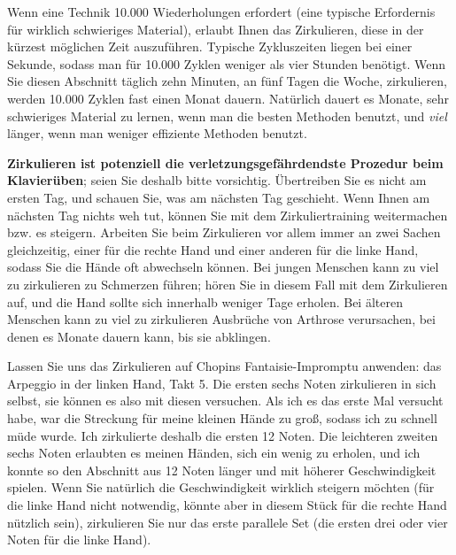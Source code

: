 Wenn eine Technik 10.000 Wiederholungen erfordert (eine typische Erfordernis für wirklich schwieriges Material), erlaubt Ihnen das Zirkulieren, diese in der kürzest möglichen Zeit auszuführen.
Typische Zykluszeiten liegen bei einer Sekunde, sodass man für 10.000 Zyklen weniger als vier Stunden benötigt.
Wenn Sie diesen Abschnitt täglich zehn Minuten, an fünf Tagen die Woche, zirkulieren, werden 10.000 Zyklen fast einen Monat dauern.
Natürlich dauert es Monate, sehr schwieriges Material zu lernen, wenn man die besten Methoden benutzt, und \textit{viel} länger, wenn man weniger effiziente Methoden benutzt.

\textbf{Zirkulieren ist potenziell die verletzungsgefährdendste Prozedur beim Klavierüben}; seien Sie deshalb bitte vorsichtig.
Übertreiben Sie es nicht am ersten Tag, und schauen Sie, was am nächsten Tag geschieht.
Wenn Ihnen am nächsten Tag nichts weh tut, können Sie mit dem Zirkuliertraining weitermachen bzw. es steigern.
Arbeiten Sie beim Zirkulieren vor allem immer an zwei Sachen gleichzeitig, einer für die rechte Hand und einer anderen für die linke Hand, sodass Sie die Hände oft abwechseln können.
Bei jungen Menschen kann zu viel zu zirkulieren zu Schmerzen führen; hören Sie in diesem Fall mit dem Zirkulieren auf, und die Hand sollte sich innerhalb weniger Tage erholen.
Bei älteren Menschen kann zu viel zu zirkulieren Ausbrüche von Arthrose verursachen, bei denen es Monate dauern kann, bis sie abklingen.
 

\label{c1iii2fi}

Lassen Sie uns das Zirkulieren auf Chopins Fantaisie-Impromptu anwenden: das Arpeggio in der linken Hand, Takt 5.
Die ersten sechs Noten zirkulieren in sich selbst, sie können es also mit diesen versuchen.
Als ich es das erste Mal versucht habe, war die Streckung für meine kleinen Hände zu groß, sodass ich zu schnell müde wurde.
Ich zirkulierte deshalb die ersten 12 Noten.
Die leichteren zweiten sechs Noten erlaubten es meinen Händen, sich ein wenig zu erholen, und ich konnte so den Abschnitt aus 12 Noten länger und mit höherer Geschwindigkeit spielen.
Wenn Sie natürlich die Geschwindigkeit wirklich steigern möchten (für die linke Hand nicht notwendig, könnte aber in diesem Stück für die rechte Hand nützlich sein), zirkulieren Sie nur das erste parallele Set (die ersten drei oder vier Noten für die linke Hand).

